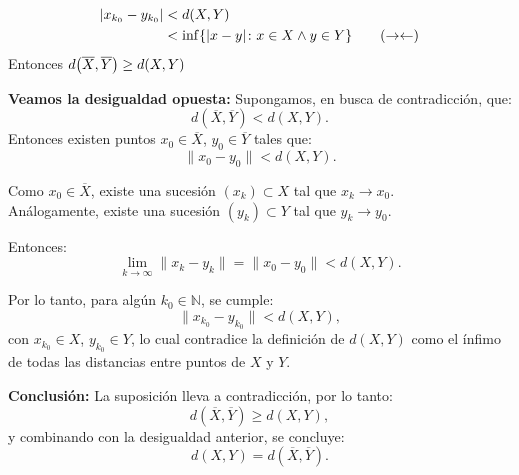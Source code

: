 {\begin{align*}
	\abs{x_{k_0} - y_{k_0}} &< d(X, Y)\\
	&< \inf\{\abs{x-y} \colon x \in X \wedge y \in Y\} \qquad (\rightarrow \leftarrow)
\end{align*}
Entonces $d\pqty{\overline{X}, \overline{Y}} \geq d\pqty{X, Y} $



\vspace{1ex}
\textbf{Veamos la desigualdad opuesta:} Supongamos, en busca de contradicción, que:
\[
d(\overline{X}, \overline{Y}) < d(X, Y).
\]
Entonces existen puntos \( x_0 \in \overline{X} \), \( y_0 \in \overline{Y} \) tales que:
\[
\|x_0 - y_0\| < d(X, Y).
\]

Como \( x_0 \in \overline{X} \), existe una sucesión \( (x_k) \subset X \) tal que \( x_k \to x_0 \).\\
Análogamente, existe una sucesión \( (y_k) \subset Y \) tal que \( y_k \to y_0 \).

Entonces:
\[
\lim_{k \to \infty} \|x_k - y_k\| = \|x_0 - y_0\| < d(X, Y).
\]

Por lo tanto, para algún \( k_0 \in \mathbb{N} \), se cumple:
\[
\|x_{k_0} - y_{k_0}\| < d(X, Y),
\]
con \( x_{k_0} \in X \), \( y_{k_0} \in Y \), lo cual contradice la definición de \( d(X, Y) \) como el ínfimo de todas las distancias entre puntos de \( X \) y \( Y \).

\vspace{1ex}
\textbf{Conclusión:} La suposición lleva a contradicción, por lo tanto:
\[
d(\overline{X}, \overline{Y}) \geq d(X, Y),
\]
y combinando con la desigualdad anterior, se concluye:
\[
d(X, Y) = d(\overline{X}, \overline{Y}).
\]
}

 

\thmrpf{}{}{

}{

}
 
 
 